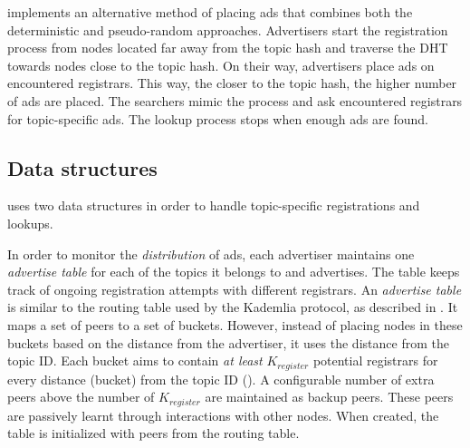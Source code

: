 \sysname implements an alternative method of placing ads that combines both the deterministic and pseudo-random approaches.
Advertisers start the registration process from nodes located far away from the topic hash and traverse the DHT towards nodes close to the topic hash.
On their way, advertisers place ads on encountered registrars.
This way, the closer to the topic hash, the higher number of ads are placed.
The searchers mimic the process and ask encountered registrars for topic-specific ads.
The lookup process stops when enough ads are found.

\subsection{Data structures}
\label{sec:struct}

\sysname uses two data structures in order to handle topic-specific registrations and lookups. 

In order to monitor the \emph{distribution} of ads, each advertiser maintains one \emph{advertise table} for each of the topics it belongs to and advertises.
The table keeps track of ongoing registration attempts with different registrars.
An \emph{advertise table} is similar to the routing table used by the Kademlia protocol, as described in .
It maps a set of peers to a set of buckets.
However, instead of placing nodes in these buckets based on the distance from the advertiser, it uses the distance from the topic ID.
Each bucket aims to contain \emph{at least} $K_\textit{register}$ potential registrars for every distance (bucket) from the topic ID ().
A configurable number of extra peers above the number of $K_\textit{register}$ are maintained as backup peers.
These peers are passively learnt through interactions with other nodes.
When created, the table is initialized with peers from the routing table.


